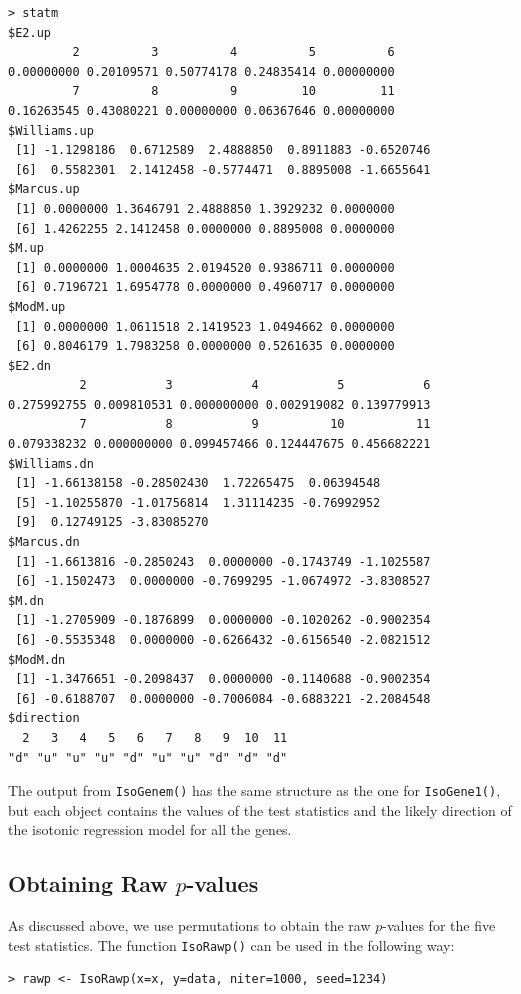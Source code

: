 \begin{center}
\begin{boxit}
\begin{verbatim}
> statm
$E2.up
         2          3          4          5          6
0.00000000 0.20109571 0.50774178 0.24835414 0.00000000
         7          8          9         10         11
0.16263545 0.43080221 0.00000000 0.06367646 0.00000000
$Williams.up
 [1] -1.1298186  0.6712589  2.4888850  0.8911883 -0.6520746
 [6]  0.5582301  2.1412458 -0.5774471  0.8895008 -1.6655641
$Marcus.up
 [1] 0.0000000 1.3646791 2.4888850 1.3929232 0.0000000
 [6] 1.4262255 2.1412458 0.0000000 0.8895008 0.0000000
$M.up
 [1] 0.0000000 1.0004635 2.0194520 0.9386711 0.0000000
 [6] 0.7196721 1.6954778 0.0000000 0.4960717 0.0000000
$ModM.up
 [1] 0.0000000 1.0611518 2.1419523 1.0494662 0.0000000
 [6] 0.8046179 1.7983258 0.0000000 0.5261635 0.0000000
$E2.dn
          2           3           4           5           6
0.275992755 0.009810531 0.000000000 0.002919082 0.139779913
          7           8           9          10          11
0.079338232 0.000000000 0.099457466 0.124447675 0.456682221
$Williams.dn
 [1] -1.66138158 -0.28502430  1.72265475  0.06394548
 [5] -1.10255870 -1.01756814  1.31114235 -0.76992952
 [9]  0.12749125 -3.83085270
$Marcus.dn
 [1] -1.6613816 -0.2850243  0.0000000 -0.1743749 -1.1025587
 [6] -1.1502473  0.0000000 -0.7699295 -1.0674972 -3.8308527
$M.dn
 [1] -1.2705909 -0.1876899  0.0000000 -0.1020262 -0.9002354
 [6] -0.5535348  0.0000000 -0.6266432 -0.6156540 -2.0821512
$ModM.dn
 [1] -1.3476651 -0.2098437  0.0000000 -0.1140688 -0.9002354
 [6] -0.6188707  0.0000000 -0.7006084 -0.6883221 -2.2084548
$direction
  2   3   4   5   6   7   8   9  10  11
"d" "u" "u" "u" "d" "u" "u" "d" "d" "d"
\end{verbatim}
\end{boxit}
\end{center}

The output from \texttt{IsoGenem()} has the same structure as the one
for \texttt{IsoGene1()}, but each object contains the values of the
test statistics and the likely direction of the isotonic regression
model for all the genes.


\subsection{Obtaining Raw $p$-values}

As discussed above, we use permutations to obtain the raw $p$-values
for the five test statistics. The function \texttt{IsoRawp()} can be
used in the following way:
\begin{center}
\begin{boxit}
\begin{verbatim}
> rawp <- IsoRawp(x=x, y=data, niter=1000, seed=1234)
\end{verbatim}
\end{boxit}
\end{center}


